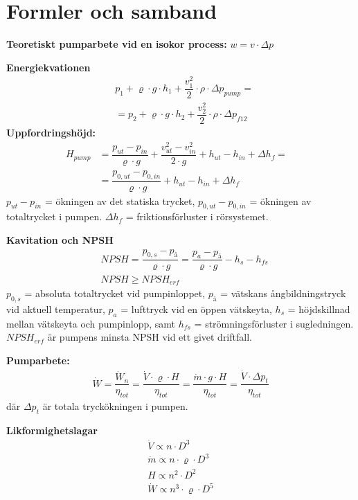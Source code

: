 \section*{Formler och samband}
	\textbf{Teoretiskt pumparbete vid en isokor process: } $w=v \cdot \Delta p$ \par
\textbf{Energiekvationen }  
	\begin{align*}
    & p_1 + \varrho \cdot g \cdot h_1 + \dfrac{v_1^2}{2} \cdot \rho \cdot  \Delta p_{pump} = \\ 
    & = p_2 + \varrho \cdot g \cdot h_2 + \dfrac{v_2^2}{2} \cdot \rho \cdot  \Delta p_{f12} 
	\end{align*}
\textbf{Uppfordringshöjd:} 
	\begin{align*}
    H_{pump} & = \dfrac{p_{ut}-p_{in}}{\varrho \cdot g}+\dfrac{v^2_{ut}-v^2_{in}}{2\cdot g}+h_{ut}-h_{in} + \Delta h_f = &\\
    & = \dfrac{p_{0,ut}-p_{0,in}}{\varrho \cdot g}+h_{ut}-h_{in} + \Delta h_f  
	\end{align*}
$p_{ut}-p_{in}$ = ökningen av det statiska trycket, $p_{0,ut}-p_{0,in}$ = ökningen av totaltrycket i pumpen. $\Delta h_f$ = friktionsförluster i rörsystemet. \par
\textbf{Kavitation och NPSH}
 \begin{align*}
	& \textit{NPSH} = \dfrac{p_{0,s} - p_\text{å}}{\varrho \cdot g} = \dfrac{p_a - p_\text{å}}{\varrho \cdot g} - h_s - h_{fs} \\
	&	\textit{NPSH} \geq \textit{NPSH}_{erf}
 \end{align*}
$p_{0,s}$ = absoluta totaltrycket vid pumpinloppet, $p_\text{å}$ = vätskans ångbildningstryck vid aktuell temperatur, $p_a$ = lufttryck vid en öppen vätskeyta, $h_s$ = höjdskillnad mellan vätskeyta och pumpinlopp, samt $h_{fs}$ = strömningsförluster i sugledningen. $\textit{NPSH}_{erf}$ är pumpens minsta NPSH vid ett givet driftfall.\par
	\textbf{Pumparbete: }
	\begin{align*}
    & \dot{W} = \dfrac{\dot{W}_n}{\eta_{tot}} = \dfrac{\dot{V}\cdot\varrho\cdot{H}}{\eta_{tot}}= \dfrac{\dot{m}\cdot g \cdot H }{\eta_{tot}}=  
    \dfrac{\dot{V}\cdot\Delta p_t}{\eta_{tot}} & 
	\end{align*}
       där $ \Delta p_t $  är totala tryckökningen i pumpen. \par
	\textbf{Likformighetslagar } 
	\begin{align*}
  & \dot{V} \propto n \cdot D^3 & \\ 
	& \dot{m} \propto n \cdot \varrho \cdot  D^3 \\ 
  & H\propto n^2 \cdot D^2  \\
  & \dot{W}\propto n^3 \cdot \varrho \cdot D^5  
	\end{align*}
